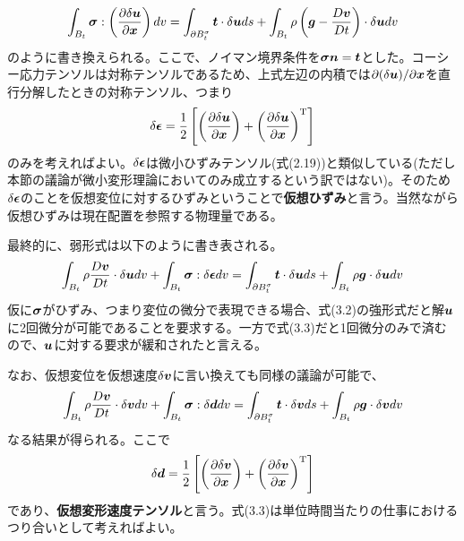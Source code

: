\documentclass[dvipdfmx, 9pt, a4paper]{jsarticle}
\numberwithin{equation}{section}
\newcommand{\bm}[1]{{\mbox{\boldmath $#1$}}}
\begin{document}
\begin{equation}
\int_{B_t}\bm \sigma : \left(\frac{\partial \delta \bm u}{\partial \bm x}\right)dv=\int_{\partial B_t^\sigma}\bm t\cdot \delta \bm uds+\int_{B_t}\rho\left(\bm g - \frac{D\bm v}{Dt}\right)\cdot \delta \bm udv \notag
\end{equation}
のように書き換えられる。ここで、ノイマン境界条件を$\bm \sigma\bm n=\bm t$とした。コーシー応力テンソルは対称テンソルであるため、上式左辺の内積では$\partial(\delta \bm u)/\partial \bm x$を直行分解したときの対称テンソル、つまり
\begin{equation}
\delta \bm \epsilon=\frac{1}{2}\left[ \left(\frac{\partial \delta \bm u}{\partial \bm x}\right)+\left(\frac{\partial \delta \bm u}{\partial \bm x}\right)^{\rm T} \right] \notag
\end{equation}
のみを考えればよい。$\delta \bm \epsilon$は微小ひずみテンソル(式(2.19))と類似している(ただし本節の議論が微小変形理論においてのみ成立するという訳ではない)。そのため$\delta \bm \epsilon$のことを仮想変位に対するひずみということで{\bf 仮想ひずみ}と言う。当然ながら仮想ひずみは現在配置を参照する物理量である。\par
最終的に、弱形式は以下のように書き表される。
\begin{equation}
\int_{B_t} \rho\frac{D\bm v}{Dt}\cdot \delta \bm udv + \int_{B_t}\bm \sigma : \delta \bm \epsilon dv=\int_{\partial B_t^\sigma}\bm t\cdot \delta \bm uds+\int_{B_t}\rho\bm g \cdot \delta \bm u dv
\end{equation}
仮に$\bm \sigma$がひずみ、つまり変位の微分で表現できる場合、式(3.2)の強形式だと解$\bm u$に2回微分が可能であることを要求する。一方で式(3.3)だと1回微分のみで済むので、$\bm u$に対する要求が緩和されたと言える。\par
なお、仮想変位を仮想速度$\delta \bm v$に言い換えても同様の議論が可能で、
\begin{equation}
\int_{B_t} \rho\frac{D\bm v}{Dt}\cdot \delta \bm vdv + \int_{B_t}\bm \sigma : \delta \bm d dv=\int_{\partial B_t^\sigma}\bm t\cdot \delta \bm vds+\int_{B_t}\rho\bm g \cdot \delta \bm v dv
\end{equation}
なる結果が得られる。ここで
\begin{equation}
\delta \bm d=\frac{1}{2}\left[ \left(\frac{\partial \delta \bm v}{\partial \bm x}\right)+\left(\frac{\partial \delta \bm v}{\partial \bm x}\right)^{\rm T} \right] \notag
\end{equation}
であり、{\bf 仮想変形速度テンソル}と言う。式(3.3)は単位時間当たりの仕事におけるつり合いとして考えればよい。
\end{document}
